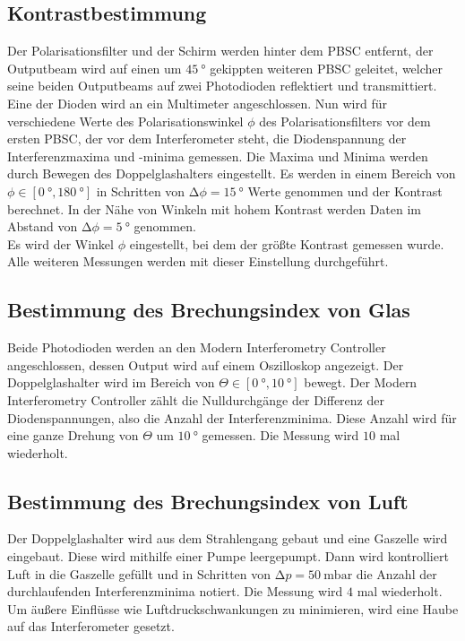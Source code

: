 \subsection{Kontrastbestimmung}
\label{subsec:Kontrastbestimmmung}

\noindent Der Polarisationsfilter und der Schirm werden hinter dem PBSC entfernt, der Outputbeam wird auf einen um $\SI{45}{\degree}$ gekippten weiteren PBSC geleitet, welcher seine beiden
Outputbeams auf zwei Photodioden reflektiert und transmittiert. Eine der Dioden wird an ein Multimeter angeschlossen. Nun wird für verschiedene Werte des Polarisationswinkel $\phi$ des 
Polarisationsfilters vor dem ersten PBSC, der vor dem Interferometer steht, die Diodenspannung der Interferenzmaxima und -minima gemessen. Die Maxima und Minima werden durch Bewegen des Doppelglashalters eingestellt. Es werden 
in einem Bereich von $\phi \in \left[ \SI{0}{\degree}, \SI{180}{\degree}\right]$ in Schritten von $\increment \phi = \SI{15}{\degree}$ Werte genommen und der Kontrast berechnet. In der Nähe von Winkeln 
mit hohem Kontrast werden Daten im Abstand von $\increment\phi = \SI{5}{\degree}$ genommen.\\
Es wird der Winkel $\phi$ eingestellt, bei dem der größte Kontrast gemessen wurde. Alle weiteren Messungen werden mit dieser Einstellung durchgeführt.


\subsection{Bestimmung des Brechungsindex von Glas}
\label{subsec:n_glas_Durchführung}

\noindent Beide Photodioden werden an den Modern Interferometry Controller angeschlossen, dessen Output wird auf einem Oszilloskop angezeigt. Der Doppelglashalter wird im Bereich von 
$\Theta \in \left[ \SI{0}{\degree}, \SI{10}{\degree}\right]$ bewegt. Der Modern  Interferometry Controller zählt die Nulldurchgänge der Differenz der Diodenspannungen, also die Anzahl 
der Interferenzminima. Diese Anzahl wird für eine ganze Drehung von $\Theta$ um $\SI{10}{\degree}$ gemessen. Die Messung wird $\num{10}$ mal wiederholt.


\subsection{Bestimmung des Brechungsindex von Luft}
\label{subsec:Durchführung_n_Luft}

\noindent Der Doppelglashalter wird aus dem Strahlengang gebaut und eine Gaszelle wird eingebaut. Diese wird mithilfe einer Pumpe leergepumpt. Dann wird kontrolliert Luft in die Gaszelle 
gefüllt und in Schritten von $\increment p = \SI{50}{\milli\bar}$ die Anzahl der durchlaufenden Interferenzminima notiert. Die Messung wird $\num{4}$ mal wiederholt. Um äußere Einflüsse wie 
Luftdruckschwankungen zu minimieren, wird eine Haube auf das Interferometer gesetzt. 